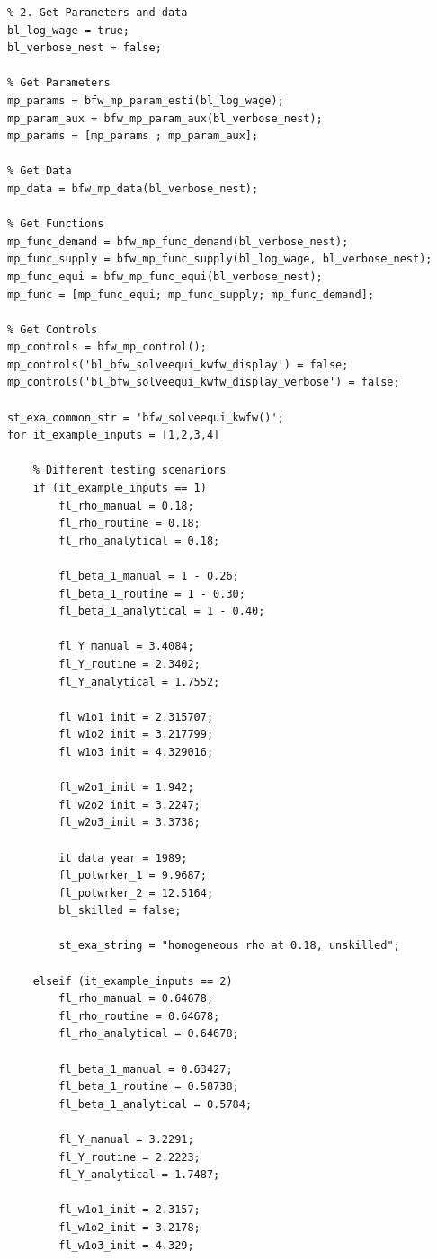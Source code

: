 \documentclass[
]{book}
\begin{document}
\begin{verbatim}
% 2. Get Parameters and data
bl_log_wage = true;
bl_verbose_nest = false;

% Get Parameters
mp_params = bfw_mp_param_esti(bl_log_wage);
mp_param_aux = bfw_mp_param_aux(bl_verbose_nest);
mp_params = [mp_params ; mp_param_aux];

% Get Data
mp_data = bfw_mp_data(bl_verbose_nest);

% Get Functions
mp_func_demand = bfw_mp_func_demand(bl_verbose_nest);
mp_func_supply = bfw_mp_func_supply(bl_log_wage, bl_verbose_nest);
mp_func_equi = bfw_mp_func_equi(bl_verbose_nest);
mp_func = [mp_func_equi; mp_func_supply; mp_func_demand];

% Get Controls
mp_controls = bfw_mp_control();
mp_controls('bl_bfw_solveequi_kwfw_display') = false;
mp_controls('bl_bfw_solveequi_kwfw_display_verbose') = false;

st_exa_common_str = 'bfw_solveequi_kwfw()';
for it_example_inputs = [1,2,3,4]

    % Different testing scenariors
    if (it_example_inputs == 1)
        fl_rho_manual = 0.18;
        fl_rho_routine = 0.18;
        fl_rho_analytical = 0.18;

        fl_beta_1_manual = 1 - 0.26;
        fl_beta_1_routine = 1 - 0.30;
        fl_beta_1_analytical = 1 - 0.40;

        fl_Y_manual = 3.4084;
        fl_Y_routine = 2.3402;
        fl_Y_analytical = 1.7552;

        fl_w1o1_init = 2.315707;
        fl_w1o2_init = 3.217799;
        fl_w1o3_init = 4.329016;

        fl_w2o1_init = 1.942;
        fl_w2o2_init = 3.2247;
        fl_w2o3_init = 3.3738;

        it_data_year = 1989;
        fl_potwrker_1 = 9.9687;
        fl_potwrker_2 = 12.5164;
        bl_skilled = false;
        
        st_exa_string = "homogeneous rho at 0.18, unskilled";

    elseif (it_example_inputs == 2)
        fl_rho_manual = 0.64678;
        fl_rho_routine = 0.64678;
        fl_rho_analytical = 0.64678;

        fl_beta_1_manual = 0.63427;
        fl_beta_1_routine = 0.58738;
        fl_beta_1_analytical = 0.5784;

        fl_Y_manual = 3.2291;
        fl_Y_routine = 2.2223;
        fl_Y_analytical = 1.7487;

        fl_w1o1_init = 2.3157;
        fl_w1o2_init = 3.2178;
        fl_w1o3_init = 4.329;


\end{verbatim}
\end{document}
